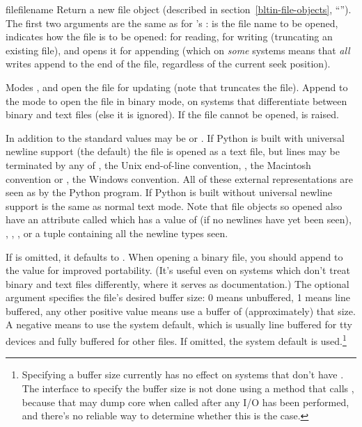 \begin{funcdesc}{file}{filename}
  Return a new file object (described in
  section~\ref{bltin-file-objects}, ``'').
  The first two arguments are the same as for 's
  :  is the file name to be opened,
   indicates how the file is to be opened:  for
  reading,  for writing (truncating an existing file), and
   opens it for appending (which on \emph{some} \UNIX{}
  systems means that \emph{all} writes append to the end of the file,
  regardless of the current seek position).

  Modes ,  and  open the file for
  updating (note that  truncates the file).  Append
   to the mode to open the file in binary mode, on systems
  that differentiate between binary and text files (else it is
  ignored).  If the file cannot be opened,  is
  raised.
  
  In addition to the standard  values 
  may be  or . If Python is built with universal
  newline support (the default) the file is opened as a text file, but
  lines may be terminated by any of , the Unix end-of-line
  convention,
  , the Macintosh convention or , the Windows
  convention. All of these external representations are seen as
  by the Python program. If Python is built without universal newline support
    is the same as normal text mode.  Note that
  file objects so opened also have an attribute called
   which has a value of  (if no newlines
  have yet been seen), , , , 
  or a tuple containing all the newline types seen.

  If  is omitted, it defaults to .  When opening a
  binary file, you should append  to the  value
  for improved portability.  (It's useful even on systems which don't
  treat binary and text files differently, where it serves as
  documentation.)
  The optional  argument specifies the
  file's desired buffer size: 0 means unbuffered, 1 means line
  buffered, any other positive value means use a buffer of
  (approximately) that size.  A negative  means to use
  the system default, which is usually line buffered for tty
  devices and fully buffered for other files.  If omitted, the system
  default is used.\footnote{
    Specifying a buffer size currently has no effect on systems that
    don't have .  The interface to specify the
    buffer size is not done using a method that calls
    , because that may dump core when called
    after any I/O has been performed, and there's no reliable way to
    determine whether this is the case.}


\end{funcdesc}

